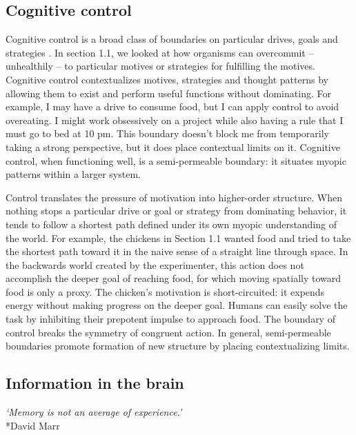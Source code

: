 \documentclass[12pt]{article}
\begin{document}
\subsection{Cognitive control}

Cognitive control is a broad class of boundaries on particular drives, goals and strategies \citep{botvinick2001conflict, braver2012variable, miyake2000unity, miller2001integrative}. In section 1.1, we looked at how organisms can overcommit -- unhealthily -- to particular motives or strategies for fulfilling the motives. Cognitive control contextualizes motives, strategies and thought patterns by allowing them to exist and perform useful functions without dominating. For example, I may have a drive to consume food, but I can apply control to avoid overeating. I might work obsessively on a project while also having a rule that I must go to bed at 10 pm. This boundary doesn't block me from temporarily taking a strong perspective, but it does place contextual limits on it. Cognitive control, when functioning well, is a semi-permeable boundary: it situates myopic patterns within a larger system. 

Control translates the pressure of motivation into higher-order structure. When nothing stops a particular drive or goal or strategy from dominating behavior, it tends to follow a shortest path defined under its own myopic understanding of the world. For example, the chickens in Section 1.1 wanted food and tried to take the shortest path toward it in the naive sense of a straight line through space. In the backwards world created by the experimenter, this action does not accomplish the deeper goal of reaching food, for which moving spatially toward food is only a proxy. The chicken's motivation is short-circuited: it expends energy without making progress on the deeper goal. Humans can easily solve the task by inhibiting their prepotent impulse to approach food. The boundary of control breaks the symmetry of congruent action. In general, semi-permeable boundaries promote formation of new structure by placing contextualizing limits.


\subsection{Information in the brain}

\begin{center}
\textit{`Memory is not an average of experience.'}\\*David Marr
\end{center}
\end{document}

